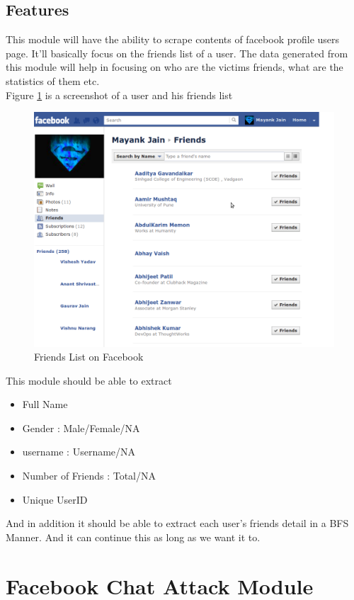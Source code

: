 \subsection{Features}
This module will have the ability to scrape contents of facebook profile users page. It'll basically focus on the friends list of a user.
The data generated from this module will help in focusing on who are the victims friends, what are the statistics of them etc.\\[0.5cm]
Figure \ref{fig:myfriends} is a screenshot of a user and his friends list
\begin{figure}[htb]
\centering
\includegraphics[scale=0.4]{project/diagrams/myfriends}
\caption{Friends List on Facebook}
\label{fig:myfriends} %
\end{figure}

This module should be able to extract\\
\begin{itemize}
\item{Full Name}
\item{Gender : Male/Female/NA}
\item{username : Username/NA}
\item{Number of Friends : Total/NA}
\item{Unique UserID}
\end{itemize}

And in addition it should be able to extract each user's friends detail in a BFS Manner. And it can continue this as long as we want it to.

\section{Facebook Chat Attack Module}
